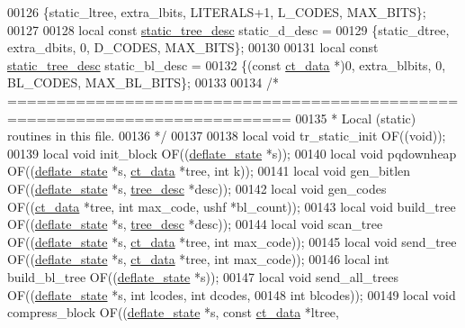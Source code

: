 \begin{DoxyCode}
00126 \{static\_ltree, extra\_lbits, LITERALS+1, L\_CODES, MAX\_BITS\};
00127 
00128 local \textcolor{keyword}{const} \hyperlink{structstatic__tree__desc__s}{static\_tree\_desc}  static\_d\_desc =
00129 \{static\_dtree, extra\_dbits, 0,          D\_CODES, MAX\_BITS\};
00130 
00131 local \textcolor{keyword}{const} \hyperlink{structstatic__tree__desc__s}{static\_tree\_desc}  static\_bl\_desc =
00132 \{(\textcolor{keyword}{const} \hyperlink{structct__data__s}{ct\_data} *)0, extra\_blbits, 0,   BL\_CODES, MAX\_BL\_BITS\};
00133 
00134 \textcolor{comment}{/* ===========================================================================}
00135 \textcolor{comment}{ * Local (static) routines in this file.}
00136 \textcolor{comment}{ */}
00137 
00138 local \textcolor{keywordtype}{void} tr\_static\_init OF((\textcolor{keywordtype}{void}));
00139 local \textcolor{keywordtype}{void} init\_block     OF((\hyperlink{structinternal__state}{deflate\_state} *s));
00140 local \textcolor{keywordtype}{void} pqdownheap     OF((\hyperlink{structinternal__state}{deflate\_state} *s, \hyperlink{structct__data__s}{ct\_data} *tree, \textcolor{keywordtype}{int} k));
00141 local \textcolor{keywordtype}{void} gen\_bitlen     OF((\hyperlink{structinternal__state}{deflate\_state} *s, \hyperlink{structtree__desc__s}{tree\_desc} *desc));
00142 local \textcolor{keywordtype}{void} gen\_codes      OF((\hyperlink{structct__data__s}{ct\_data} *tree, \textcolor{keywordtype}{int} max\_code, ushf *bl\_count));
00143 local \textcolor{keywordtype}{void} build\_tree     OF((\hyperlink{structinternal__state}{deflate\_state} *s, \hyperlink{structtree__desc__s}{tree\_desc} *desc));
00144 local \textcolor{keywordtype}{void} scan\_tree      OF((\hyperlink{structinternal__state}{deflate\_state} *s, \hyperlink{structct__data__s}{ct\_data} *tree, \textcolor{keywordtype}{int} max\_code));
00145 local \textcolor{keywordtype}{void} send\_tree      OF((\hyperlink{structinternal__state}{deflate\_state} *s, \hyperlink{structct__data__s}{ct\_data} *tree, \textcolor{keywordtype}{int} max\_code));
00146 local \textcolor{keywordtype}{int}  build\_bl\_tree  OF((\hyperlink{structinternal__state}{deflate\_state} *s));
00147 local \textcolor{keywordtype}{void} send\_all\_trees OF((\hyperlink{structinternal__state}{deflate\_state} *s, \textcolor{keywordtype}{int} lcodes, \textcolor{keywordtype}{int} dcodes,
00148                               \textcolor{keywordtype}{int} blcodes));
00149 local \textcolor{keywordtype}{void} compress\_block OF((\hyperlink{structinternal__state}{deflate\_state} *s, \textcolor{keyword}{const} \hyperlink{structct__data__s}{ct\_data} *ltree,

\end{DoxyCode}
